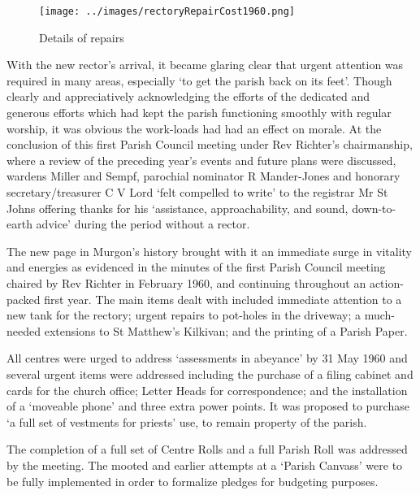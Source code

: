 \begin{figure}
\begin{center}
\texttt{[image: ../images/rectoryRepairCost1960.png]}
\caption{Details of repairs}
\end{center}
\end{figure}




With the new rector's arrival, it became glaring clear that urgent attention was required in many areas, especially `to get the parish back on its feet'. Though clearly and appreciatively acknowledging the efforts of the dedicated and generous efforts which had kept the parish functioning smoothly with regular worship, it was obvious the work-loads had had an effect on morale. At the conclusion of this first Parish Council meeting under Rev Richter's chairmanship, where a review of the preceding year's events and future plans were discussed, wardens Miller and Sempf, parochial nominator R Mander-Jones and honorary secretary/treasurer C V Lord `felt compelled to write' to the registrar Mr St Johns offering thanks for his `assistance, approachability, and sound, down-to-earth advice' during the period without a rector.



The new page in Murgon's history brought with it an immediate surge in vitality and energies as evidenced in the minutes of the first Parish Council meeting chaired by Rev Richter in February 1960, and continuing throughout an action-packed first year. The main items dealt with included immediate attention to a new tank for the rectory; urgent repairs to pot-holes in the driveway; a much-needed extensions to St Matthew's Kilkivan; and the printing of a Parish Paper.



All centres were urged to address `assessments in abeyance' by 31 May 1960 and several urgent items were addressed including the purchase of a filing cabinet and cards for the church office; Letter Heads for correspondence; and the installation of a `moveable phone' and three extra power points. It was proposed to purchase `a full set of vestments for priests' use, to remain property of the parish.



The completion of a full set of Centre Rolls and a full Parish Roll was addressed by the meeting. The mooted and earlier attempts at a `Parish Canvass' were to be fully implemented in order to formalize pledges for budgeting purposes.



